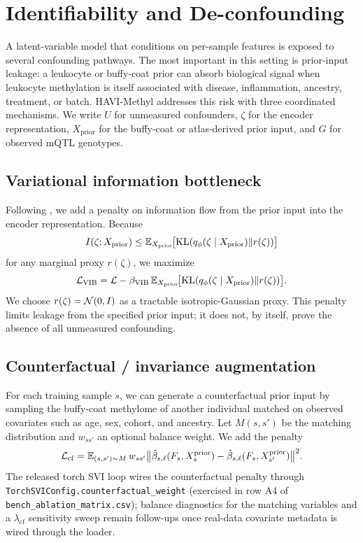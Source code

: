 \section{Identifiability and De-confounding}
\label{sec:identify}

A latent-variable model that conditions on per-sample features is exposed to several confounding pathways. The most important in this setting is prior-input leakage: a leukocyte or buffy-coat prior can absorb biological signal when leukocyte methylation is itself associated with disease, inflammation, ancestry, treatment, or batch. HAVI-Methyl addresses this risk with three coordinated mechanisms. We write $U$ for unmeasured confounders, $\zeta$ for the encoder representation, $X_{\mathrm{prior}}$ for the buffy-coat or atlas-derived prior input, and $G$ for observed mQTL genotypes.

\subsection{Variational information bottleneck}
Following \citet{alemi2017vib}, we add a penalty on information flow from the prior input into the encoder representation. Because
\begin{equation}
I(\zeta;X_{\mathrm{prior}})\le \mathbb{E}_{X_{\mathrm{prior}}}\!\big[\mathrm{KL}(q_\phi(\zeta\mid X_{\mathrm{prior}})\|r(\zeta))\big]
\end{equation}
for any marginal proxy $r(\zeta)$, we maximize
\begin{equation}
\mathcal{L}_{\mathrm{VIB}}=\mathcal{L} - \beta_{\mathrm{VIB}}\,\mathbb{E}_{X_{\mathrm{prior}}}\!\big[\mathrm{KL}(q_\phi(\zeta\mid X_{\mathrm{prior}})\|r(\zeta))\big].
\label{eq:vib}
\end{equation}
We choose $r(\zeta)=\mathcal{N}(0,I)$ as a tractable isotropic-Gaussian proxy. This penalty limits leakage from the specified prior input; it does not, by itself, prove the absence of all unmeasured confounding.

\subsection{Counterfactual / invariance augmentation}
For each training sample $s$, we can generate a counterfactual prior input by sampling the buffy-coat methylome of another individual matched on observed covariates such as age, sex, cohort, and ancestry. Let $M(s,s')$ be the matching distribution and $w_{ss'}$ an optional balance weight. We add the penalty
\begin{equation}
\mathcal{L}_{\mathrm{cf}}=\mathbb{E}_{(s,s')\sim M}\,w_{ss'}\big\|\hat\beta_{s,\ell}(F_s, X^{\mathrm{prior}}_s) - \hat\beta_{s,\ell}(F_s, X^{\mathrm{prior}}_{s'})\big\|^2.
\label{eq:cf-loss}
\end{equation}
The released torch SVI loop wires the counterfactual penalty through \texttt{TorchSVIConfig.counterfactual\_weight} (exercised in row A4 of \texttt{bench\_ablation\_matrix.csv}); balance diagnostics for the matching variables and a $\lambda_{\mathrm{cf}}$ sensitivity sweep remain follow-ups once real-data covariate metadata is wired through the loader.

